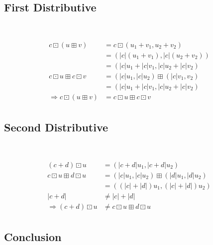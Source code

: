 \documentclass{article}
\begin{document}
\subsection{First Distributive}

~

\begin{equation}
\tag{2.8-1}
\begin{split}
c \boxdot (u \boxplus v) &= c \boxdot (u_1+v_1,u_2+v_2)\\
&= (\lvert c\rvert (u_1+v_1),\lvert c\rvert (u_2+v_2))\\
&= (\lvert c\rvert u_1+\lvert c\rvert v_1, \lvert c\rvert u_2+\lvert c\rvert v_2)\\
c \boxdot u \boxplus c\boxdot v &= (\lvert c\rvert u_1,\lvert c\rvert u_2) \boxplus (\lvert c\rvert v_1,v_2)\\
&= (\lvert c\rvert u_1+\lvert c\rvert v_1, \lvert c\rvert u_2+\lvert c\rvert v_2)\\
\Rightarrow c \boxdot (u \boxplus v) &=c \boxdot u \boxplus c\boxdot v\\
\end{split}
\end{equation}

\subsection{Second Distributive}

~

\begin{equation}
\tag{2.9-1}
\begin{split}
(c+d)\boxdot u &= (\lvert c+d\rvert u_1,\lvert c+d\rvert u_2)\\
c\boxdot u \boxplus d\boxdot u &= (\lvert c\rvert u_1,\lvert c\rvert u_2) \boxplus (\lvert d\rvert u_1,\lvert d\rvert u_2)\\
&=((\lvert c\rvert + \lvert d\rvert)u_1,(\lvert c\rvert + \lvert d\rvert)u_2)\\
\lvert c+d\rvert &\ne \lvert c\rvert + \lvert d\rvert\\
\Rightarrow (c+d)\boxdot u &\ne c\boxdot u \boxplus d\boxdot u\\
\end{split}
\end{equation}


\subsection{Conclusion}
\end{document}
